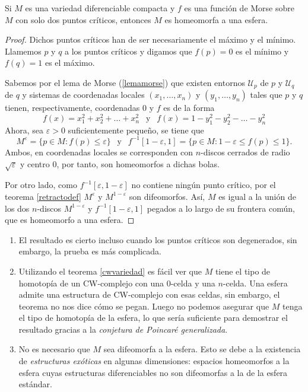 \begin{theorem}\label{reeb}
    Si $M$ es una variedad diferenciable compacta y $f$ es una función de Morse sobre $M$ con solo dos puntos críticos, entonces $M$ es homeomorfa a una esfera.
\end{theorem}
\begin{proof}
    Dichos puntos críticos han de ser necesariamente el máximo y el mínimo. Llamemos $p$ y $q$ a los puntos críticos y digamos que $f(p)=0$ es el mínimo y $f(q)=1$ es el máximo.

    Sabemos por el lema de Morse (\ref{lemamorse}) que existen entornos $\mathcal{U}_p$ de $p$ y $\mathcal{U}_q$ de $q$ y sistemas de coordenadas locales $(x_1,\dots,x_n)$ y $(y_1,\dots,y_n)$ tales que $p$ y $q$ tienen, respectivamente, coordenadas $0$ y $f$ es de la forma
    \begin{equation*}
        f(x) = x_1^2+x_2^2+\dots+x_n^2~~\text{ y }~~ f(x)=1-y_1^2- y_2^2-\dots-y_n^2
    \end{equation*}
    Ahora, sea $\varepsilon > 0$ suficientemente pequeño, se tiene que
    \begin{equation*}
        M^{\varepsilon} = \{p\in M \colon f(p)\le \varepsilon\} ~~\text{ y }~~ f^{-1}[1-\varepsilon,1] = \{p\in M \colon 1-\varepsilon \le f(p)\le 1\}.
    \end{equation*}
    Ambos, en coordenadas locales se corresponden con $n$-discos cerrados de radio $\sqrt{\varepsilon}$ y centro $0$, por tanto, son homeomorfos a dichas bolas.

    Por otro lado, como $f^{-1}[\varepsilon, 1-\varepsilon]$ no contiene ningún punto crítico, por el teorema \ref{retractodef} $M^{\varepsilon}$ y $M^{1-\varepsilon}$ son difeomorfos. Así, $M$ es igual a la unión de los dos $n$-discos $M^{1-\varepsilon}$ y $f^{-1}[1-\varepsilon,1]$ pegados a lo largo de su frontera común, que es homeomorfo a una esfera.

\end{proof}
\vspace{-1em}
\begin{remark}
    \hfil
    \begin{enumerate}[label=(\roman*)]
        \item El resultado es cierto incluso cuando los puntos críticos son degenerados, sin embargo, la prueba es más complicada.
        \item Utilizando el teorema \ref{cwvariedad} es fácil ver que $M$ tiene el tipo de homotopía de un CW-complejo con una $0$-celda y una $n$-celda. Una esfera admite una estructura de CW-complejo con esas celdas, sin embargo, el teorema no nos dice cómo se pegan. Luego no podemos asegurar que $M$ tenga el tipo de homotopía de la esfera, lo que sería suficiente para demostrar el resultado gracias a la \textit{conjetura de Poincaré generalizada}.
        \item No es necesario que $M$ sea difeomorfa a la esfera. Esto se debe a la existencia de \textit{estructuras exóticas} en algunas dimensiones: espacios homeomorfos a la esfera cuyas estructuras diferenciables no son difeomorfas a la de la esfera estándar.
    \end{enumerate}
\end{remark}

